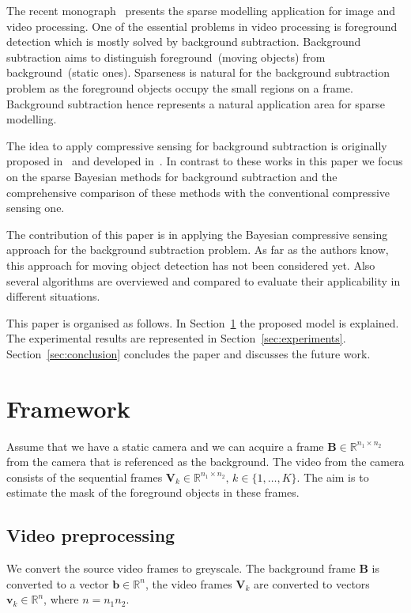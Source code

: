 \documentclass[conference]{IEEEtran}
\begin{document}
The recent monograph~\cite{Bach14} presents the sparse modelling application for image and video processing. One of the essential problems in video processing is foreground detection which is mostly solved by background subtraction. Background subtraction aims to distinguish foreground~(moving objects) from background~(static ones). Sparseness is natural for the background subtraction problem as the foreground objects occupy the small regions on a frame. Background subtraction hence represents a natural application area for sparse modelling. 

The idea to apply compressive sensing for background subtraction is originally proposed in~\cite{Cevher2008} and developed in~\cite{Warnell2014}. In contrast to these works in this paper we focus on the sparse Bayesian methods for background subtraction and the comprehensive comparison of these methods with the conventional compressive sensing one. 

The contribution of this paper is in applying the Bayesian compressive sensing approach for the background subtraction problem. As far as the authors know, this approach for moving object detection has not been considered yet. Also several algorithms are overviewed and compared to evaluate their applicability in different situations.

This paper is organised as follows. In Section~\ref{sec:framework} the proposed model is explained. The experimental results are represented in Section~\ref{sec:experiments}. Section~\ref{sec:conclusion} concludes the paper and discusses the future work.  
 
\section{Framework}
\label{sec:framework}
Assume that we have a static camera and we can acquire a frame $\mathbf{B}\in\mathbb{R}^{n_1 \times n_2}$ from the camera that is referenced as the background. The video from the camera consists of the sequential frames $\mathbf{V}_k \in\mathbb{R}^{n_1 \times n_2},\,k\in \{1,\ldots,K\}$. The aim is to estimate the mask of the foreground objects in these frames. 

\subsection{Video preprocessing}
We convert the source video frames to greyscale. The background frame $\mathbf{B}$ is converted to a vector $\mathbf{b} \in \mathbb{R}^n$, the video frames $\mathbf{V}_k$ are converted to vectors $\mathbf{v}_k \in \mathbb{R}^n$, where $n=n_1 n_2$.
\end{document}

